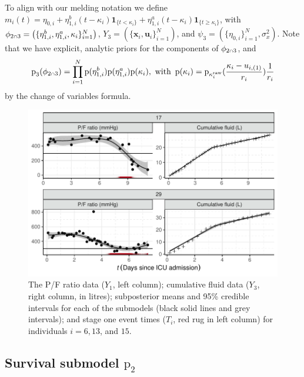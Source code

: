 \documentclass[
  10pt,
  a4paper,
]{article}
\let\Oldcap\cap
\renewcommand{\cap}{\mathrel{\mathsmaller{\Oldcap}}}
\newcommand{\pd}{\text{p}}
\begin{document}
To align with our melding notation we define
\(m_{i}(t) = \eta_{0, i} + \eta^{b}_{1, i}(t - \kappa_{i})\boldsymbol{1}_{\{t < \kappa_{i}\}} + \eta^{a}_{1, i}(t - \kappa_{i})\boldsymbol{1}_{\{t \geq \kappa_{i}\}}\),
with
\(\phi_{2 \cap 3} = \left(\{\eta^{b}_{1, i}, \eta^{a}_{1, i}, \kappa_{i}\}_{i = 1}^{N}\right)\),
\(Y_{3} = (\{\boldsymbol{x}_{i}, \boldsymbol{u}_{i}\}_{i = 1}^{N})\),
and \(\psi_{3} = (\{\eta_{0, i}\}_{i = 1}^{N}, \sigma^{2}_{x})\). Note
that we have explicit, analytic priors for the components of
\(\phi_{2 \cap 3}\), and \begin{equation}
  \pd_{3}(\phi_{2 \cap 3}) = \prod_{i = 1}^{N} \pd(\eta^{b}_{1, i}) \pd(\eta^{a}_{1, i}) \pd(\kappa_{i}), \,\, \text{with} \,\,\,
  \pd(\kappa_{i}) = \pd_{\kappa^{\text{raw}}_{i}}(\frac{\kappa_{i} - u_{i, (1)}}{r_{i}}) \frac{1}{r_{i}}
\end{equation} by the change of variables formula.

\begin{figure}

{\centering \includegraphics{../plots/mimic-example/combined-pf-fluid-fit-plot-small} 

}

\caption{The P/F ratio data ($Y_{1}$, left column); cumulative fluid data ($Y_{3}$, right column, in litres); subposterior means and 95\% credible intervals for each of the submodels (black solid lines and grey intervals); and stage one event times ($T_{i}$, red rug in left column) for individuals $i = 6, 13$, and $15$.}\label{fig:pf_fit_and_fluid_fit_plot}
\end{figure}

\hypertarget{survival-submodel-pd_2}{%
\subsection{\texorpdfstring{Survival submodel
\(\pd_{2}\)}{Survival submodel \textbackslash pd\_\{2\}}}\label{survival-submodel-pd_2}}
\end{document}
